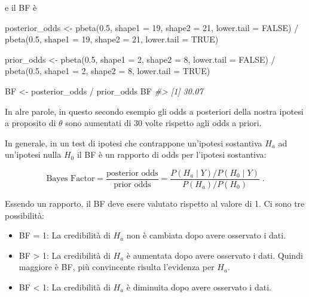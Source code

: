 \documentclass[
  11pt,
]{krantz}
\makeatletter
\newenvironment{Shaded}{\begin{snugshade}}{\end{snugshade}}
\newcommand{\AttributeTok}[1]{\textcolor[rgb]{0.61,0.61,0.61}{#1}}
\newcommand{\CommentTok}[1]{\textcolor[rgb]{0.37,0.37,0.37}{\textit{#1}}}
\newcommand{\ConstantTok}[1]{\textcolor[rgb]{0,0,0}{#1}}
\newcommand{\DecValTok}[1]{\textcolor[rgb]{0.06,0.06,0.06}{#1}}
\newcommand{\FloatTok}[1]{\textcolor[rgb]{0.06,0.06,0.06}{#1}}
\newcommand{\FunctionTok}[1]{\textcolor[rgb]{0,0,0}{#1}}
\newcommand{\NormalTok}[1]{#1}
\newcommand{\OtherTok}[1]{\textcolor[rgb]{0.37,0.37,0.37}{#1}}
\newcommand{\SpecialCharTok}[1]{\textcolor[rgb]{0,0,0}{#1}}
\providecommand{\tightlist}{%
  \setlength{\itemsep}{0pt}\setlength{\parskip}{0pt}}
\newenvironment{kframe}{%
\medskip{}
\setlength{\fboxsep}{.8em}
 \def\at@end@of@kframe{}%
 \ifinner\ifhmode%
  \def\at@end@of@kframe{\end{minipage}}%
  \begin{minipage}{\columnwidth}%
 \fi\fi%
 \def\FrameCommand##1{\hskip\@totalleftmargin \hskip-\fboxsep
 \colorbox{shadecolor}{##1}\hskip-\fboxsep
     \hskip-\linewidth \hskip-\@totalleftmargin \hskip\columnwidth}%
 \MakeFramed {\advance\hsize-\width
   \@totalleftmargin\z@ \linewidth\hsize
   \@setminipage}}%
 {\par\unskip\endMakeFramed%
 \at@end@of@kframe}
\renewenvironment{Shaded}{\begin{kframe}}{\end{kframe}}
\theoremstyle{definition}
\theoremstyle{definition}
\theoremstyle{definition}
\theoremstyle{definition}
\theoremstyle{remark}
\makeatother
\begin{document}
e il BF è

\begin{Shaded}
\begin{Highlighting}[]
\NormalTok{posterior\_odds }\OtherTok{\textless{}{-}}
  \FunctionTok{pbeta}\NormalTok{(}\FloatTok{0.5}\NormalTok{, }\AttributeTok{shape1 =} \DecValTok{19}\NormalTok{, }\AttributeTok{shape2 =} \DecValTok{21}\NormalTok{, }\AttributeTok{lower.tail =} \ConstantTok{FALSE}\NormalTok{) }\SpecialCharTok{/}
    \FunctionTok{pbeta}\NormalTok{(}\FloatTok{0.5}\NormalTok{, }\AttributeTok{shape1 =} \DecValTok{19}\NormalTok{, }\AttributeTok{shape2 =} \DecValTok{21}\NormalTok{, }\AttributeTok{lower.tail =} \ConstantTok{TRUE}\NormalTok{)}

\NormalTok{prior\_odds }\OtherTok{\textless{}{-}}
  \FunctionTok{pbeta}\NormalTok{(}\FloatTok{0.5}\NormalTok{, }\AttributeTok{shape1 =} \DecValTok{2}\NormalTok{, }\AttributeTok{shape2 =} \DecValTok{8}\NormalTok{, }\AttributeTok{lower.tail =} \ConstantTok{FALSE}\NormalTok{) }\SpecialCharTok{/}
    \FunctionTok{pbeta}\NormalTok{(}\FloatTok{0.5}\NormalTok{, }\AttributeTok{shape1 =} \DecValTok{2}\NormalTok{, }\AttributeTok{shape2 =} \DecValTok{8}\NormalTok{, }\AttributeTok{lower.tail =} \ConstantTok{TRUE}\NormalTok{)}

\NormalTok{BF }\OtherTok{\textless{}{-}}\NormalTok{ posterior\_odds }\SpecialCharTok{/}\NormalTok{ prior\_odds}
\NormalTok{BF}
\CommentTok{\#\textgreater{} [1] 30.07}
\end{Highlighting}
\end{Shaded}

In alre parole, in questo secondo esempio gli odds a posteriori della nostra ipotesi a proposito di \(\theta\) sono aumentati di 30 volte rispetto agli odds a priori.

In generale, in un test di ipotesi che contrappone un'ipotesi sostantiva \(H_a\) ad un'ipotesi nulla \(H_0\) il BF è un rapporto di odds per l'ipotesi sostantiva:

\[
\text{Bayes Factor}
= \frac{\text{posterior odds}}{\text{prior odds}}
= \frac{P(H_a \mid Y) / P(H_0 \mid Y)}{P(H_a) / P(H_0)}
 \; .
\]

Essendo un rapporto, il BF deve esere valutato rispetto al valore di 1. Ci sono tre possibilità:

\begin{itemize}
\tightlist
\item
  BF = 1: La credibilità di \(H_a\) non è cambiata dopo avere osservato i dati.
\item
  BF \textgreater{} 1: La credibilità di \(H_a\) è aumentata dopo avere osservato i dati. Quindi maggiore è BF, più convincente risulta l'evidenza per \(H_a\).
\item
  BF \textless{} 1: La credibilità di \(H_a\) è diminuita dopo avere osservato i dati.
\end{itemize}
\end{document}
